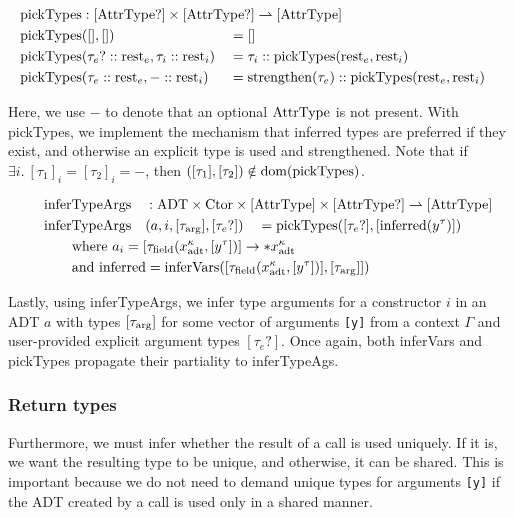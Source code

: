 \newcommand{\pickTypes}{\mathrm{pickTypes}}
\begin{alignat*}{3}
	\pickTypes &: \mathrlap{[\AttrType?] \times [\AttrType?] \rightharpoonup [\AttrType]} \\
	\pickTypes&([], []) &&= [] \\
	\pickTypes&(\tau_e? :: \rest_e, \tau_i :: \rest_i) &&= \tau_i :: \pickTypes(\rest_e, \rest_i) \\
	\pickTypes&(\tau_e :: \rest_e, - :: \rest_i) &&= \strengthen(\tau_e) :: \pickTypes(\rest_e, \rest_i) \\
\end{alignat*}

Here, we use $-$ to denote that an optional $\mathrm{AttrType}$ is not present.
With pickTypes, we implement the mechanism that inferred types are preferred if they exist, and otherwise an explicit type is used and strengthened. Note that if $\exists i.\ [\tau_1]_i = [\tau_2]_i = -$, then $([\tau_1], [\tau_2]) \notin \dom(\pickTypes)$.

\newcommand{\inferTypeArgs}{\mathrm{inferTypeArgs}}
\begin{alignat*}{3}
	&\inferTypeArgs &&: \mathrlap{\ADT \times \Ctor \times [\AttrType] \times [\AttrType?] \rightharpoonup [\AttrType]} \\
	&\inferTypeArgs&&(a, i, [\tau_\arrg], [\tau_e?]) &&= \pickTypes([\tau_e?], [\mathrm{inferred}(y^\tau)])\\
	&\rebreak{\text{where } a_i = [\tau_\field(x^\kappa_\adt, [y^\tau])] \to *x^\kappa_\adt} \\
	&\rebreak{\text{and } \mathrm{inferred} = \inferVars([\tau_\field(x^\kappa_\adt, [y^\tau])], [\tau_\arrg]])}
\end{alignat*}

Lastly, using inferTypeArgs, we infer type arguments for a constructor $i$ in an ADT $a$ with types $[\tau_{\mathrm{arg}}]$ for some vector of arguments \texttt{[y]} from a context $\Gamma$ and user-provided explicit argument types $[\tau_e?]$. Once again, both inferVars and pickTypes propagate their partiality to inferTypeAgs.

\subsubsection{Return types}
Furthermore, we must infer whether the result of a  call is used uniquely. If it is, we want the resulting type to be unique, and otherwise, it can be shared. This is important because we do not need to demand unique types for arguments \texttt{[y]} if the ADT created by a  call is used only in a shared manner.

